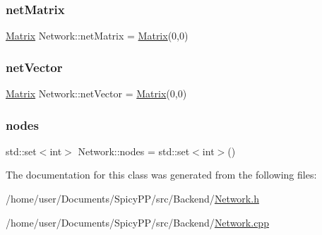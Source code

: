 \subsubsection{\texorpdfstring{net\+Matrix}{netMatrix}}
{\footnotesize\ttfamily \hyperlink{classMatrix}{Matrix} Network\+::net\+Matrix = \hyperlink{classMatrix}{Matrix}(0,0)\hspace{0.3cm}{\ttfamily [private]}}

\mbox{\label{classNetwork_a93b7a4e3182a75be5181d2f909235654}} 
\subsubsection{\texorpdfstring{net\+Vector}{netVector}}
{\footnotesize\ttfamily \hyperlink{classMatrix}{Matrix} Network\+::net\+Vector = \hyperlink{classMatrix}{Matrix}(0,0)\hspace{0.3cm}{\ttfamily [private]}}

\mbox{\label{classNetwork_a0e6aeccbefae639a173ebf2d759b34e0}} 
\subsubsection{\texorpdfstring{nodes}{nodes}}
{\footnotesize\ttfamily std\+::set$<$int$>$ Network\+::nodes = std\+::set$<$int$>$()\hspace{0.3cm}{\ttfamily [private]}}



The documentation for this class was generated from the following files\+:\begin{DoxyCompactItemize}
\item 
/home/user/\+Documents/\+Spicy\+P\+P/src/\+Backend/\hyperlink{Network_8h}{Network.\+h}\item 
/home/user/\+Documents/\+Spicy\+P\+P/src/\+Backend/\hyperlink{Network_8cpp}{Network.\+cpp}\end{DoxyCompactItemize}
